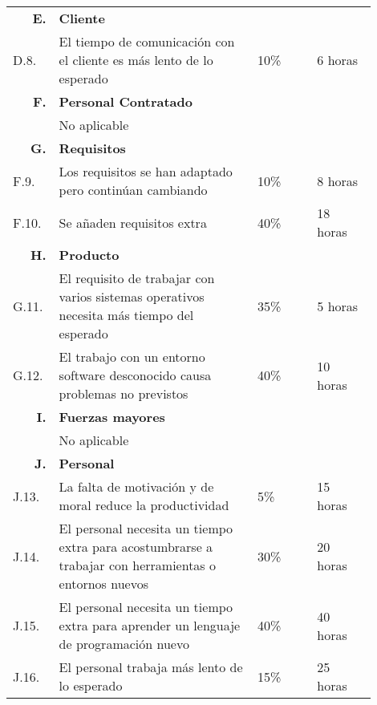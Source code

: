\begin{table}[H]
\begin{tabular}{p{0.1\linewidth}p{0.5\linewidth}p{0.15\linewidth}p{0.15\linewidth}}
		\multicolumn{1}{r}{\cellcolor{black!30}\textbf{E. }} &
		\multicolumn{3}{l}{\cellcolor{black!30}\textbf{Cliente}}\\
		D.8. &El tiempo de comunicación con el cliente es más lento de lo esperado			&	10\%	&	6 horas\\
		
		\multicolumn{1}{r}{\cellcolor{black!30}\textbf{F. }} &
		\multicolumn{3}{l}{\cellcolor{black!30}\textbf{Personal Contratado}}\\
		&No aplicable&&\\
		
		\multicolumn{1}{r}{\cellcolor{black!30}\textbf{G. }} &
		\multicolumn{3}{l}{\cellcolor{black!30}\textbf{Requisitos}}\\
		F.9. &Los requisitos se han adaptado pero continúan cambiando							&	10\%	& 8 horas\\
		F.10. &Se añaden requisitos extra														&	40\%	& 18 horas\\
		
		\multicolumn{1}{r}{\cellcolor{black!30}\textbf{H. }} &
		\multicolumn{3}{l}{\cellcolor{black!30}\textbf{Producto}}\\ 
		G.11. &El requisito de trabajar con varios sistemas operativos necesita más tiempo del esperado	&	35\%	& 5 horas\\
		G.12. &El trabajo con un entorno software desconocido causa problemas no previstos	&	40\%	& 10 horas\\
		
		\multicolumn{1}{r}{\cellcolor{black!30}\textbf{I. }} &
		\multicolumn{3}{l}{\cellcolor{black!30}\textbf{Fuerzas mayores}}\\
		&No aplicable&&\\	
		
		\multicolumn{1}{r}{\cellcolor{black!30}\textbf{J. }} &
		\multicolumn{3}{l}{\cellcolor{black!30}\textbf{Personal}}\\
		J.13. &La falta de motivación y de moral reduce la productividad						&	5\%		& 15 horas\\
		J.14. &El personal necesita un tiempo extra para acostumbrarse a trabajar con herramientas o entornos nuevos	&	30\%	&	20 horas\\
		J.15. &El personal necesita un tiempo extra para aprender un lenguaje de programación nuevo	&	40\%	&	40 horas\\
		J.16. &El personal trabaja más lento de lo esperado									&	15\%	&	25 horas\\
		

\end{tabular}
\end{table}
